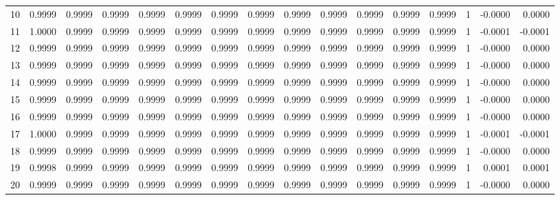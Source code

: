 \begin{tabular}{lrrrrrrrrrrrrrrr}
10  &      0.9999 &  0.9999 &  0.9999 &  0.9999 &  0.9999 &  0.9999 &  0.9999 &  0.9999 &  0.9999 &  0.9999 &   0.9999 &     0.9999 &      1 &                   -0.0000 &                     0.0000 \\
11  &      1.0000 &  0.9999 &  0.9999 &  0.9999 &  0.9999 &  0.9999 &  0.9999 &  0.9999 &  0.9999 &  0.9999 &   0.9999 &     0.9999 &      1 &                   -0.0001 &                    -0.0001 \\
12  &      0.9999 &  0.9999 &  0.9999 &  0.9999 &  0.9999 &  0.9999 &  0.9999 &  0.9999 &  0.9999 &  0.9999 &   0.9999 &     0.9999 &      1 &                   -0.0000 &                     0.0000 \\
13  &      0.9999 &  0.9999 &  0.9999 &  0.9999 &  0.9999 &  0.9999 &  0.9999 &  0.9999 &  0.9999 &  0.9999 &   0.9999 &     0.9999 &      1 &                   -0.0000 &                     0.0000 \\
14  &      0.9999 &  0.9999 &  0.9999 &  0.9999 &  0.9999 &  0.9999 &  0.9999 &  0.9999 &  0.9999 &  0.9999 &   0.9999 &     0.9999 &      1 &                   -0.0000 &                     0.0000 \\
15  &      0.9999 &  0.9999 &  0.9999 &  0.9999 &  0.9999 &  0.9999 &  0.9999 &  0.9999 &  0.9999 &  0.9999 &   0.9999 &     0.9999 &      1 &                   -0.0000 &                     0.0000 \\
16  &      0.9999 &  0.9999 &  0.9999 &  0.9999 &  0.9999 &  0.9999 &  0.9999 &  0.9999 &  0.9999 &  0.9999 &   0.9999 &     0.9999 &      1 &                   -0.0000 &                     0.0000 \\
17  &      1.0000 &  0.9999 &  0.9999 &  0.9999 &  0.9999 &  0.9999 &  0.9999 &  0.9999 &  0.9999 &  0.9999 &   0.9999 &     0.9999 &      1 &                   -0.0001 &                    -0.0001 \\
18  &      0.9999 &  0.9999 &  0.9999 &  0.9999 &  0.9999 &  0.9999 &  0.9999 &  0.9999 &  0.9999 &  0.9999 &   0.9999 &     0.9999 &      1 &                   -0.0000 &                     0.0000 \\
19  &      0.9998 &  0.9999 &  0.9999 &  0.9999 &  0.9999 &  0.9999 &  0.9999 &  0.9999 &  0.9999 &  0.9999 &   0.9999 &     0.9999 &      1 &                    0.0001 &                     0.0001 \\
20  &      0.9999 &  0.9999 &  0.9999 &  0.9999 &  0.9999 &  0.9999 &  0.9999 &  0.9999 &  0.9999 &  0.9999 &   0.9999 &     0.9999 &      1 &                   -0.0000 &                     0.0000 \\

\end{tabular}

